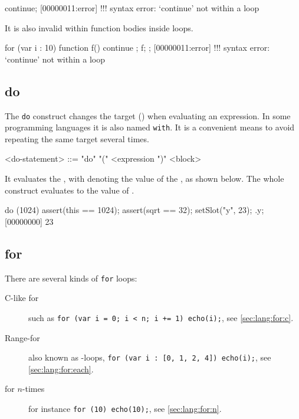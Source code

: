 \begin{urbiscript}
continue;
[00000011:error] !!! syntax error: `continue' not within a loop
\end{urbiscript}

It is also invalid within function bodies inside loops.

\begin{urbiscript}
for (var i : 10)
{
  function f() { continue };
  f;
};
[00000011:error] !!! syntax error: `continue' not within a loop
\end{urbiscript}

\subsection{do}
\label{sec:lang:do}

The \lstinline|do| construct changes the target (\this) when evaluating an
expression.  In some programming languages it is also named
\lstinline|with|.  It is a convenient means to avoid repeating the same
target several times.

\begin{bnf}
<do-statement> ::= "do" "(" <expression ")" <block>
\end{bnf}

It evaluates the , with \this denoting the value of the
, as shown below.  The whole construct evaluates to the
value of .

\begin{urbiscript}
do (1024)
{
  assert(this == 1024);
  assert(sqrt == 32);
  setSlot("y", 23);
}.y;
[00000000] 23
\end{urbiscript}




\subsection{for}
\label{sec:lang:for}
There are several kinds of \lstinline|for| loops:
\begin{description}
\item[C-like for] such as
  \lstinline|for (var i = 0; i < n; i += 1) echo(i);|, see
  \autoref{sec:lang:for:c}.
\item[Range-for] also known as -loops,
  \lstinline|for (var i : [0, 1, 2, 4]) echo(i);|, see
  \autoref{sec:lang:for:each}.
\item[for $n$-times] for instance \lstinline|for (10) echo(10);|, see
  \autoref{sec:lang:for:n}.
\end{description}

